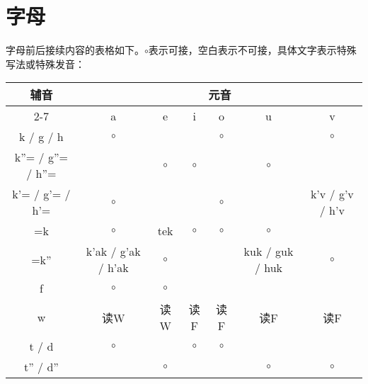 \section{字母}

字母前后接续内容的表格如下。$\circ$表示可接，空白表示不可接，具体文字表示特殊写法或特殊发音：
\begin{center}
     \begin{tabular}{c|c|c|c|c|c|c}
          \toprule
          \multirow{3}{*}{辅音} & \multicolumn{6}{c}{元音}\\%
          \cline{2-7}
          & a & e & i & o & u & v \\
          \midrule
          k / g / h    & $\circ$ & & & $\circ$ & & $\circ$ \\
          k''= / g''= / h''= & & $\circ$ & $\circ$ & & $\circ$ &\\
          k'= / g'= / h'=  & $\circ$ & & & $\circ$ & & k'v / g'v / h'v\\
          \midrule
          =k   & $\circ$ & tek &$\circ$&$\circ$&$\circ$&\\
          =k'' & k'ak / g'ak / h'ak & $\circ$ & & & kuk / guk / huk & $\circ$ \\
          \midrule
          f    & $\circ$ & $\circ$ & & & &\\
          w    & 读W & 读W & 读F & 读F & 读F & 读F\\
          \midrule
          t / d   & $\circ$ & & $\circ$ & $\circ$& &\\
          t'' / d''  & & $\circ$ & & & $\circ$ & $\circ$\\
          \bottomrule
     \end{tabular}
\end{center}
